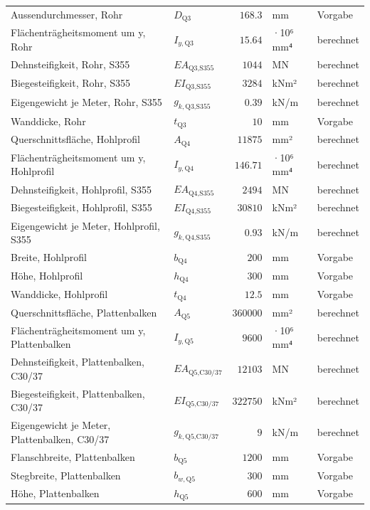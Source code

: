 \documentclass[11pt,a4paper]{article}
\begin{document}
\begin{xltabular}{\linewidth}{>{\raggedright\arraybackslash}Xlrll}
Aussendurchmesser, Rohr & $D_{\text{Q3}}$ & $168.3$ & mm & Vorgabe \\
Flächenträgheitsmoment um y, Rohr & $I_{y,\text{Q3}}$ & $15.64$ & ·10⁶ mm⁴ & berechnet \\
Dehnsteifigkeit, Rohr, S355 & $EA_{\text{Q3,S355}}$ & $1044$ & MN & berechnet \\
Biegesteifigkeit, Rohr, S355 & $EI_{\text{Q3,S355}}$ & $3284$ & kNm² & berechnet \\
Eigengewicht je Meter, Rohr, S355 & $g_{k,\text{Q3,S355}}$ & $0.39$ & kN/m & berechnet \\
Wanddicke, Rohr & $t_{\text{Q3}}$ & $10$ & mm & Vorgabe \\
Querschnittsfläche, Hohlprofil & $A_{\text{Q4}}$ & $11875$ & mm² & berechnet \\
Flächenträgheitsmoment um y, Hohlprofil & $I_{y,\text{Q4}}$ & $146.71$ & ·10⁶ mm⁴ & berechnet \\
Dehnsteifigkeit, Hohlprofil, S355 & $EA_{\text{Q4,S355}}$ & $2494$ & MN & berechnet \\
Biegesteifigkeit, Hohlprofil, S355 & $EI_{\text{Q4,S355}}$ & $30810$ & kNm² & berechnet \\
Eigengewicht je Meter, Hohlprofil, S355 & $g_{k,\text{Q4,S355}}$ & $0.93$ & kN/m & berechnet \\
Breite, Hohlprofil & $b_{\text{Q4}}$ & $200$ & mm & Vorgabe \\
Höhe, Hohlprofil & $h_{\text{Q4}}$ & $300$ & mm & Vorgabe \\
Wanddicke, Hohlprofil & $t_{\text{Q4}}$ & $12.5$ & mm & Vorgabe \\
Querschnittsfläche, Plattenbalken & $A_{\text{Q5}}$ & $360000$ & mm² & berechnet \\
Flächenträgheitsmoment um y, Plattenbalken & $I_{y,\text{Q5}}$ & $9600$ & ·10⁶ mm⁴ & berechnet \\
Dehnsteifigkeit, Plattenbalken, C30/37 & $EA_{\text{Q5,C30/37}}$ & $12103$ & MN & berechnet \\
Biegesteifigkeit, Plattenbalken, C30/37 & $EI_{\text{Q5,C30/37}}$ & $322750$ & kNm² & berechnet \\
Eigengewicht je Meter, Plattenbalken, C30/37 & $g_{k,\text{Q5,C30/37}}$ & $9$ & kN/m & berechnet \\
Flanschbreite, Plattenbalken & $b_{\text{Q5}}$ & $1200$ & mm & Vorgabe \\
Stegbreite, Plattenbalken & $b_{w,\text{Q5}}$ & $300$ & mm & Vorgabe \\
Höhe, Plattenbalken & $h_{\text{Q5}}$ & $600$ & mm & Vorgabe \\

\end{xltabular}
\end{document}
